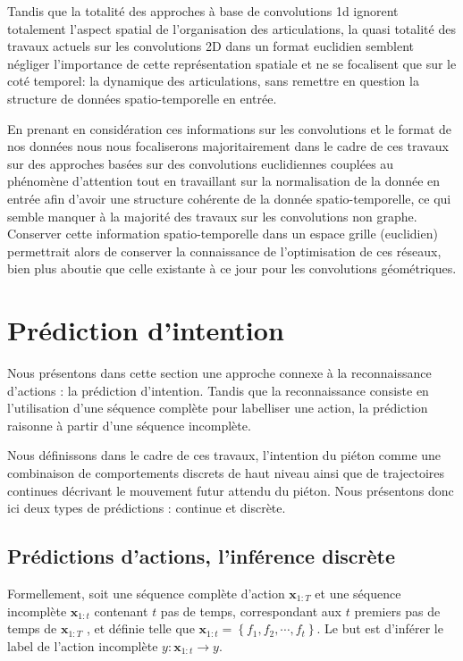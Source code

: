 Tandis que la totalité des approches à base de convolutions 1d ignorent totalement l'aspect spatial de l'organisation des articulations, la quasi totalité des travaux actuels sur les convolutions 2D dans un format euclidien semblent négliger l'importance de cette représentation spatiale et ne se focalisent que sur le coté temporel: la dynamique des articulations, sans remettre en question la structure de données spatio-temporelle en entrée.

En prenant en considération ces informations sur les convolutions et le format de nos données nous nous focaliserons majoritairement dans le cadre de ces travaux sur des approches basées sur des convolutions euclidiennes couplées au phénomène d'attention tout en travaillant sur la normalisation de la donnée en entrée afin d'avoir une structure cohérente de la donnée spatio-temporelle, ce qui semble manquer à la majorité des travaux sur les convolutions non graphe. Conserver cette information spatio-temporelle dans un espace grille (euclidien) permettrait alors de conserver la connaissance de l'optimisation de ces réseaux, bien plus aboutie que celle existante à ce jour pour les convolutions géométriques.


\chapter{Prédiction d'intention}
\label{ch:chapter3}
Nous présentons dans cette section une approche connexe à la reconnaissance d’actions : la prédiction d'intention. Tandis que la reconnaissance consiste en l'utilisation d'une séquence complète pour labelliser une action, la prédiction raisonne à partir d'une séquence incomplète. 

Nous définissons dans le cadre de ces travaux, l'intention du piéton comme une combinaison de comportements discrets de haut niveau ainsi que de trajectoires continues décrivant le mouvement futur attendu du piéton. Nous présentons donc ici deux types de prédictions : continue et discrète.

\section{Prédictions d'actions, l'inférence discrète}
Formellement, soit une séquence complète d'action $\mathbf{x}_{1: T}$ et une séquence incomplète $\mathbf{x}_{1: t}$ contenant $t$ pas de temps, correspondant aux $t$ premiers pas de temps de $\mathbf{x}_{1: T}$ , et définie telle que $\mathbf{x}_{1: t}=\left\{f_{1}, f_{2}, \cdots, f_{t}\right\}$. Le but est d'inférer le label de l'action incomplète $y: \mathbf{x}_{1: t} \rightarrow y$.\\

